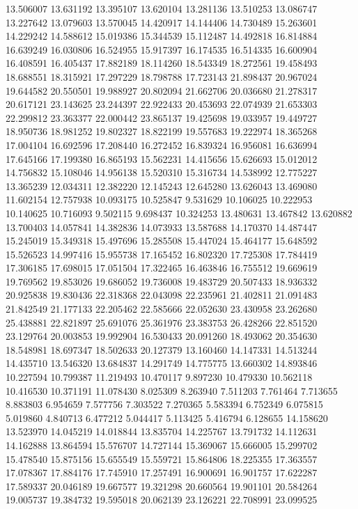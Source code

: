 13.506007
13.631192
13.395107
13.620104
13.281136
13.510253
13.086747
13.227642
13.079603
13.570045
14.420917
14.144406
14.730489
15.263601
14.229242
14.588612
15.019386
15.344539
15.112487
14.492818
16.814884
16.639249
16.030806
16.524955
15.917397
16.174535
16.514335
16.600904
16.408591
16.405437
17.882189
18.114260
18.543349
18.272561
19.458493
18.688551
18.315921
17.297229
18.798788
17.723143
21.898437
20.967024
19.644582
20.550501
19.988927
20.802094
21.662706
20.036680
21.278317
20.617121
23.143625
23.244397
22.922433
20.453693
22.074939
21.653303
22.299812
23.363377
22.000442
23.865137
19.425698
19.033957
19.449727
18.950736
18.981252
19.802327
18.822199
19.557683
19.222974
18.365268
17.004104
16.692596
17.208440
16.272452
16.839324
16.956081
16.636994
17.645166
17.199380
16.865193
15.562231
14.415656
15.626693
15.012012
14.756832
15.108046
14.956138
15.520310
15.316734
14.538992
12.775227
13.365239
12.034311
12.382220
12.145243
12.645280
13.626043
13.469080
11.602154
12.757938
10.093175
10.525847
9.531629
10.106025
10.222953
10.140625
10.716093
9.502115
9.698437
10.324253
13.480631
13.467842
13.620882
13.700403
14.057841
14.382836
14.073933
13.587688
14.170370
14.487447
15.245019
15.349318
15.497696
15.285508
15.447024
15.464177
15.648592
15.526523
14.997416
15.955738
17.165452
16.802320
17.725308
17.784419
17.306185
17.698015
17.051504
17.322465
16.463846
16.755512
19.669619
19.769562
19.853026
19.686052
19.736008
19.483729
20.507433
18.936332
20.925838
19.830436
22.318368
22.043098
22.235961
21.402811
21.091483
21.842549
21.177133
22.205462
22.585666
22.052630
23.430958
23.262680
25.438881
22.821897
25.691076
25.361976
23.383753
26.428266
22.851520
23.129764
20.003853
19.992904
16.530433
20.091260
18.493062
20.354630
18.548981
18.697347
18.502633
20.127379
13.160460
14.147331
14.513244
14.435710
13.546320
13.684837
14.291749
14.775775
13.660302
14.893846
10.227594
10.799387
11.219493
10.470117
9.897230
10.479330
10.562118
10.416530
10.371191
11.078430
8.025309
8.263940
7.511203
7.761464
7.713655
8.883803
6.954659
7.577756
7.303522
7.270365
5.583394
6.752349
6.075815
5.019860
4.840713
6.477212
5.044417
5.113425
5.416794
6.128655
14.158620
13.523970
14.045219
14.018844
13.835704
14.225767
13.791732
14.112631
14.162888
13.864594
15.576707
14.727144
15.369067
15.666005
15.299702
15.478540
15.875156
15.655549
15.559721
15.864806
18.225355
17.363557
17.078367
17.884176
17.745910
17.257491
16.900691
16.901757
17.622287
17.589337
20.046189
19.667577
19.321298
20.660564
19.901101
20.584264
19.005737
19.384732
19.595018
20.062139
23.126221
22.708991
23.099525
